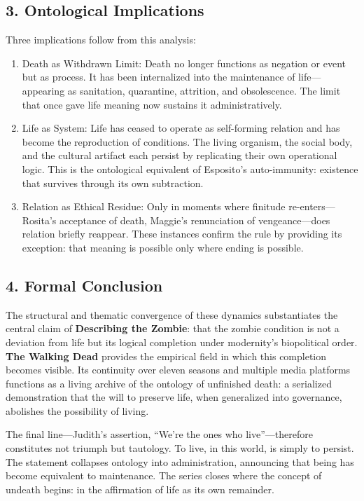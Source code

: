 \documentclass[11pt]{article}
\begin{document}
\subsection*{3. Ontological Implications}
\label{sec:orgaeaa92f}

Three implications follow from this analysis:

\begin{enumerate}
\item Death as Withdrawn Limit:  
Death no longer functions as negation or event but as process.  It has been internalized into the maintenance of life—appearing as sanitation, quarantine, attrition, and obsolescence.  The limit that once gave life meaning now sustains it administratively.

\item Life as System:  
Life has ceased to operate as self-forming relation and has become the reproduction of conditions.  The living organism, the social body, and the cultural artifact each persist by replicating their own operational logic.  This is the ontological equivalent of Esposito’s auto-immunity: existence that survives through its own subtraction.

\item Relation as Ethical Residue:  
Only in moments where finitude re-enters—Rosita’s acceptance of death, Maggie’s renunciation of vengeance—does relation briefly reappear.  These instances confirm the rule by providing its exception: that meaning is possible only where ending is possible.
\end{enumerate}
\subsection*{4. Formal Conclusion}
\label{sec:org3d60f72}

The structural and thematic convergence of these dynamics substantiates the central claim of \textbf{Describing the Zombie}: that the zombie condition is not a deviation from life but its logical completion under modernity’s biopolitical order.  
\textbf{The Walking Dead} provides the empirical field in which this completion becomes visible.  
Its continuity over eleven seasons and multiple media platforms functions as a living archive of the ontology of unfinished death: a serialized demonstration that the will to preserve life, when generalized into governance, abolishes the possibility of living.  

The final line—Judith’s assertion, “We’re the ones who live”—therefore constitutes not triumph but tautology.  
To live, in this world, is simply to persist.  
The statement collapses ontology into administration, announcing that being has become equivalent to maintenance.  
The series closes where the concept of undeath begins: in the affirmation of life as its own remainder.  
\end{document}
